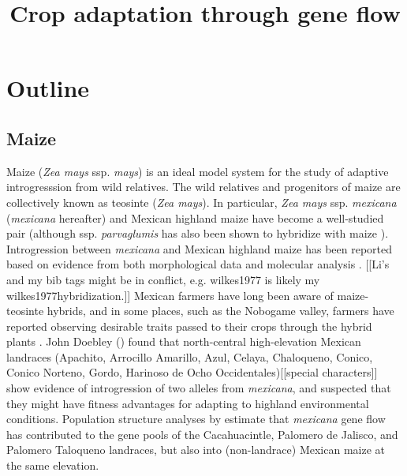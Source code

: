 \documentclass[11pt]{article}
\title{Crop adaptation through gene flow}
\begin{document}
\maketitle

\section*{Outline}






\subsection*{Maize}


Maize (\emph{Zea mays} ssp. \emph{mays}) is an ideal model system for the study of adaptive introgresssion from wild relatives.
The wild relatives and progenitors of maize are collectively known as teosinte (\emph{Zea mays}).
In particular, \emph{Zea mays} ssp. \emph{mexicana} (\emph{mexicana} hereafter) and Mexican highland maize have become a well-studied pair (although ssp. \emph{parvaglumis} has also been shown to hybridize with maize \cite{wilkes1977hybridization}).
Introgression between \emph{mexicana} and Mexican highland maize has been reported based on evidence from both morphological data \cite{wilkes1977, lauter2004, doebley1984} and molecular analysis \cite{matsuoka2002, vanHeerwaarden2011, doebley1987, warburton2011, fukunaga2005}. [[Li's and my bib tags might be in conflict, e.g. wilkes1977 is likely my wilkes1977hybridization.]]
Mexican farmers have long been aware of maize-teosinte hybrids, and in some places, such as the Nobogame valley, farmers have reported observing desirable traits passed to their crops through the hybrid plants \cite{wilkes1977hybridization} \cite{lumholtz1902unknown} \cite{wilkes1970teosinte}.
John Doebley (\cite{doebley1987patterns}) found that north-central high-elevation Mexican landraces (Apachito, Arrocillo Amarillo, Azul, Celaya, Chaloqueno, Conico, Conico Norteno, Gordo, Harinoso de Ocho Occidentales)[[special characters]] show evidence of introgression of two alleles from \emph{mexicana}, and suspected that they might have fitness advantages for adapting to highland environmental conditions.
Population structure analyses by \cite{matsuoka2002single} estimate that \emph{mexicana} gene flow has contributed to the gene pools of the Cacahuacintle, Palomero de Jalisco, and Palomero Taloqueno landraces, but also into (non-landrace) Mexican maize at the same elevation.
 
\end{document}
